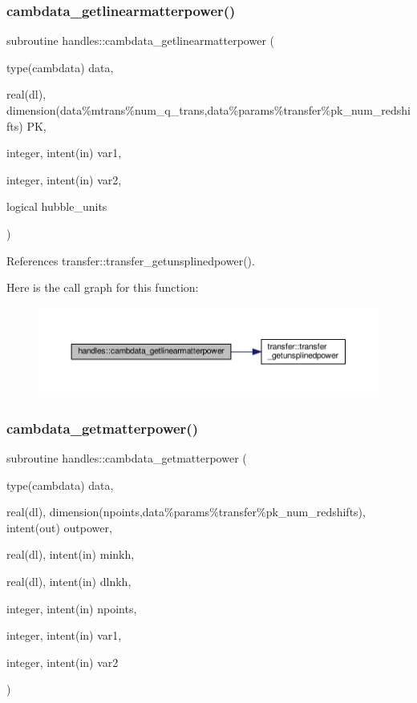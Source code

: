 \subsubsection{\texorpdfstring{cambdata\+\_\+getlinearmatterpower()}{cambdata\_getlinearmatterpower()}}
{\footnotesize\ttfamily subroutine handles\+::cambdata\+\_\+getlinearmatterpower (\begin{DoxyParamCaption}\item[{type(cambdata)}]{data,  }\item[{real(dl), dimension(data\%mtrans\%num\+\_\+q\+\_\+trans,data\%params\%transfer\%pk\+\_\+num\+\_\+redshifts)}]{PK,  }\item[{integer, intent(in)}]{var1,  }\item[{integer, intent(in)}]{var2,  }\item[{logical}]{hubble\+\_\+units }\end{DoxyParamCaption})}



References transfer\+::transfer\+\_\+getunsplinedpower().

Here is the call graph for this function\+:
\nopagebreak
\begin{figure}[H]
\begin{center}
\leavevmode
\includegraphics[width=350pt]{namespacehandles_accd4416ff2222813d3f9784504d7e5d8_cgraph}
\end{center}
\end{figure}
\mbox{\label{namespacehandles_a77db4a8f3a15895102aa6f7c7e49d5f8}} 
\subsubsection{\texorpdfstring{cambdata\+\_\+getmatterpower()}{cambdata\_getmatterpower()}}
{\footnotesize\ttfamily subroutine handles\+::cambdata\+\_\+getmatterpower (\begin{DoxyParamCaption}\item[{type(cambdata)}]{data,  }\item[{real(dl), dimension(npoints,data\%params\%transfer\%pk\+\_\+num\+\_\+redshifts), intent(out)}]{outpower,  }\item[{real(dl), intent(in)}]{minkh,  }\item[{real(dl), intent(in)}]{dlnkh,  }\item[{integer, intent(in)}]{npoints,  }\item[{integer, intent(in)}]{var1,  }\item[{integer, intent(in)}]{var2 }\end{DoxyParamCaption})}




